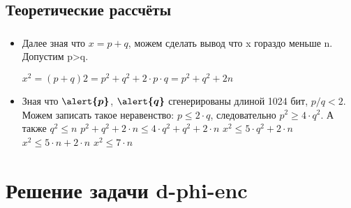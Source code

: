 \documentclass[t]{beamer}
\begin{document}
\subsection{Теоретические рассчёты}
\begin{frame}[t] %
	\frametitle{\insertsection}
	\framesubtitle{\insertsubsection}
        \begin{itemize}
            \item Далее зная что $x = p + q$, можем сделать вывод что x гораздо меньше n. Допустим p>q.
            \begin{center}
                \( x^2=(p+q)2=p^2+q^2+2 \cdot p \cdot q=p^2+q^2+2n \)\newline
            \end{center}
            
            \item Зная что $\boldsymbol{\alert{p}}$, $\boldsymbol{\alert{q}}$ сгенерированы длиной 1024 бит, $p/q < 2$. Можем записать такое неравенство:\newline
            $p\leq 2 \cdot q$, следовательно $p^2 \geq 4 \cdot q^2$. А также $q^2 \leq n$\newline
            $p^2+q^2+2\cdot n \leq 4 \cdot q^2+q^2+2 \cdot n$\newline
            $x^2 \leq 5 \cdot q^2+2 \cdot n$\newline
            $x^2 \leq 5 \cdot n+2 \cdot n$\newline
            $x^2 \leq 7 \cdot n$\newline

	\end{itemize}
\end{frame}

\section{Решение задачи d-phi-enc}
\end{document}
